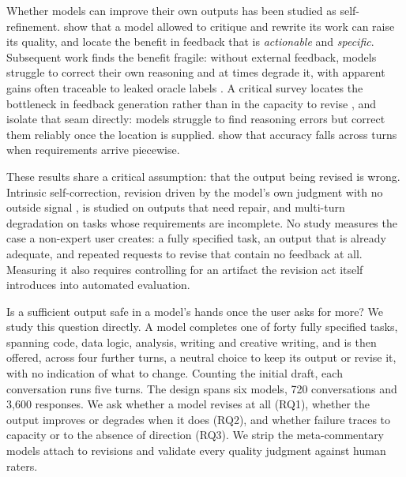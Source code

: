 Whether models can improve their own outputs has been studied as self-refinement.
\citet{madaan2024self} show that a model allowed to critique and rewrite its work can raise
its quality, and locate the benefit in feedback that is \emph{actionable} and
\emph{specific}. Subsequent work finds the benefit fragile: without external feedback,
models struggle to correct their own reasoning and at times degrade it, with apparent gains
often traceable to leaked oracle labels \cite{huang2024large}. A critical survey locates
the bottleneck in feedback generation rather than in the capacity to revise
\cite{kamoi2024selfcorrection}, and \citet{tyen2024llms} isolate that seam directly: models
struggle to find reasoning errors but correct them reliably once the location is
supplied. \citet{laban2025lost} show that accuracy falls across turns when requirements
arrive piecewise.

These results share a critical assumption: that the output being revised is wrong.
Intrinsic self-correction, revision driven by the model's own judgment with no outside
signal \cite{huang2024large, kamoi2024selfcorrection}, is studied on outputs that need
repair, and multi-turn degradation on tasks whose requirements are incomplete. No study measures the case a non-expert user creates: a fully specified task, an output
that is already adequate, and repeated requests to revise that contain no feedback at all.
Measuring it also requires controlling for an artifact the revision act itself introduces
into automated evaluation.

Is a sufficient output safe in a model's hands once the user asks for more? We study this
question directly. A model completes one of forty fully specified tasks, spanning code,
data logic, analysis, writing and creative writing, and is then offered, across four
further turns, a neutral choice to keep its output or revise it, with no indication of what
to change. Counting the initial draft, each conversation runs five turns. The design spans
six models, 720 conversations and 3,600 responses. We ask whether a model revises at all
(RQ1), whether the output improves or degrades when it does (RQ2), and whether failure
traces to capacity or to the absence of direction (RQ3). We strip the meta-commentary
models attach to revisions and validate every quality judgment against human raters.


